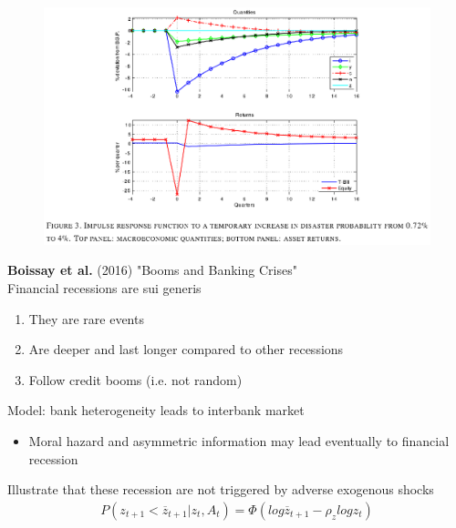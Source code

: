 \documentclass{beamer}
\begin{document}
\begin{frame}
\begin{figure}
    \includegraphics[scale=.8]{gourio3.eps}
  \end{figure}
\end{frame}

\begin{frame}
  \textbf{Boissay et al.} (2016) "Booms and Banking Crises"\\ 
  \medskip
  Financial recessions are sui generis
  \begin{enumerate}
    \item They are rare events
    \item Are deeper and last longer compared to other recessions
    \item Follow credit booms (i.e. not random)
  \end{enumerate}
  \medskip
  Model: bank heterogeneity leads to interbank market
  \begin{itemize}
    \item Moral hazard and asymmetric information may lead eventually to financial recession
  \end{itemize}
  \medskip
  Illustrate that these recession are not triggered by adverse exogenous shocks
  \begin{align}
    P(z_{t+1}<\overline{z}_{t+1}|z_t,A_t) = \Phi(log \overline{z}_{t+1}-\rho_zlog z_t)
  \end{align}
\end{frame}
\end{document}
